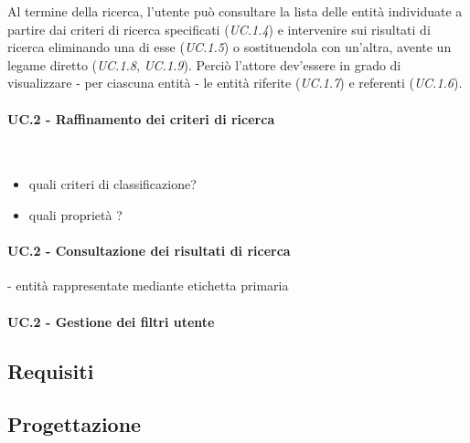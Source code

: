 Al termine della ricerca, l'utente può consultare la lista delle entità individuate a partire dai criteri di ricerca specificati (\textit{UC.1.4}) e intervenire sui risultati di ricerca eliminando una di esse (\textit{UC.1.5}) o sostituendola con un'altra, avente un legame diretto (\textit{UC.1.8}, \textit{UC.1.9}). Perciò l'attore dev'essere in grado di visualizzare - per ciascuna entità - le entità riferite (\textit{UC.1.7}) e referenti (\textit{UC.1.6}).

\paragraph{UC.2 - Raffinamento dei criteri di ricerca} \hfill \\

\begin{itemize}
	\item quali criteri di classificazione?
	\item quali proprietà ?
\end{itemize}

\paragraph{UC.2 - Consultazione dei risultati di ricerca}
- entità rappresentate mediante etichetta primaria

\paragraph{UC.2 - Gestione dei filtri utente}

\subsection{Requisiti}

\subsection{Progettazione}
